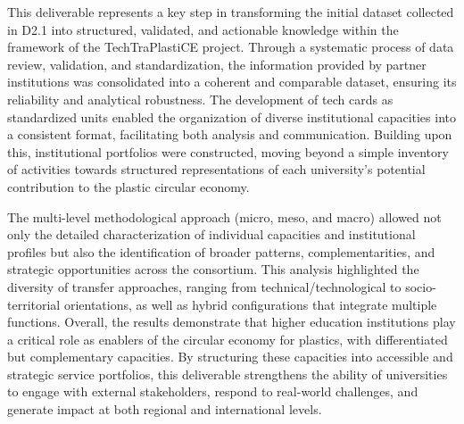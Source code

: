 \documentclass[
  12pt,
  oneside]{book}
\begin{document}
This deliverable represents a key step in transforming the initial
dataset collected in D2.1 into structured, validated, and actionable
knowledge within the framework of the TechTraPlastiCE project. Through a
systematic process of data review, validation, and standardization, the
information provided by partner institutions was consolidated into a
coherent and comparable dataset, ensuring its reliability and analytical
robustness. The development of tech cards as standardized units enabled
the organization of diverse institutional capacities into a consistent
format, facilitating both analysis and communication. Building upon
this, institutional portfolios were constructed, moving beyond a simple
inventory of activities towards structured representations of each
university's potential contribution to the plastic circular economy.

The multi-level methodological approach (micro, meso, and macro) allowed
not only the detailed characterization of individual capacities and
institutional profiles but also the identification of broader patterns,
complementarities, and strategic opportunities across the consortium.
This analysis highlighted the diversity of transfer approaches, ranging
from technical/technological to socio-territorial orientations, as well
as hybrid configurations that integrate multiple functions. Overall, the
results demonstrate that higher education institutions play a critical
role as enablers of the circular economy for plastics, with
differentiated but complementary capacities. By structuring these
capacities into accessible and strategic service portfolios, this
deliverable strengthens the ability of universities to engage with
external stakeholders, respond to real-world challenges, and generate
impact at both regional and international levels.


\backmatter
\end{document}
